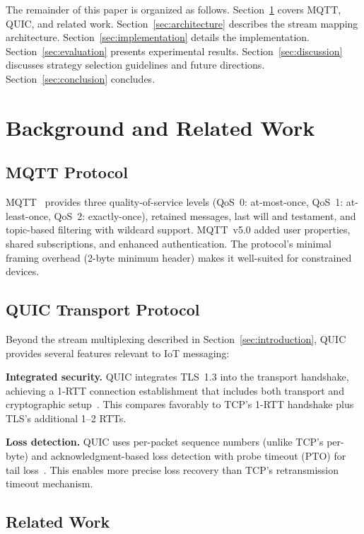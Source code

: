 \documentclass[a4paper,fleqn]{cas-dc}
\begin{document}
The remainder of this paper is organized as follows. Section~\ref{sec:background} covers MQTT, QUIC, and related work. Section~\ref{sec:architecture} describes the stream mapping architecture. Section~\ref{sec:implementation} details the implementation. Section~\ref{sec:evaluation} presents experimental results. Section~\ref{sec:discussion} discusses strategy selection guidelines and future directions. Section~\ref{sec:conclusion} concludes.


\section{Background and Related Work}
\label{sec:background}

\subsection{MQTT Protocol}

MQTT~\cite{mqtt-v5-spec} provides three quality-of-service levels (QoS~0: at-most-once, QoS~1: at-least-once, QoS~2: exactly-once), retained messages, last will and testament, and topic-based filtering with wildcard support. MQTT~v5.0 added user properties, shared subscriptions, and enhanced authentication. The protocol's minimal framing overhead (2-byte minimum header) makes it well-suited for constrained devices.

\subsection{QUIC Transport Protocol}

Beyond the stream multiplexing described in Section~\ref{sec:introduction}, QUIC~\cite{rfc9000} provides several features relevant to IoT messaging:

\textbf{Integrated security.} QUIC integrates TLS~1.3 into the transport handshake, achieving a 1-RTT connection establishment that includes both transport and cryptographic setup~\cite{rfc9001}. This compares favorably to TCP's 1-RTT handshake plus TLS's additional 1--2 RTTs.

\textbf{Loss detection.} QUIC uses per-packet sequence numbers (unlike TCP's per-byte) and acknowledgment-based loss detection with probe timeout (PTO) for tail loss~\cite{rfc9002}. This enables more precise loss recovery than TCP's retransmission timeout mechanism.

\subsection{Related Work}
\end{document}
